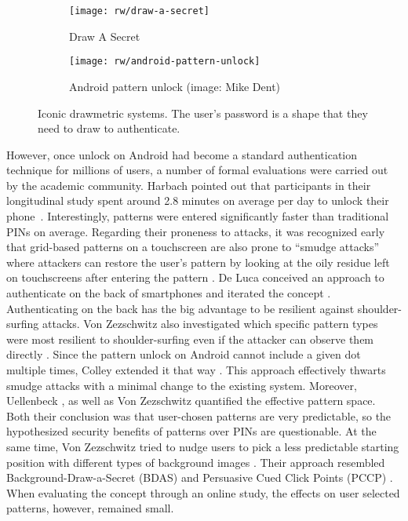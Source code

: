 	\begin{figure}[htbp]
		\centering
		\begin{subfigure}[t]{0.4\textwidth}
			\texttt{[image: rw/draw-a-secret]}
			\caption{\label{fig:rw:drawmetric:drawasecret}Draw A Secret \cite{Jermyn1999DrawASecret}}
		\end{subfigure}
		\hspace*{1em}
		\begin{subfigure}[t]{0.4\textwidth}
			\texttt{[image: rw/android-pattern-unlock]}
			\caption{\label{fig:rw:drawmetric:patternunlock} Android pattern unlock (image: Mike Dent)}
		\end{subfigure}
		\caption{\label{fig:rw:drawmetric} Iconic drawmetric systems. The user's password is a shape that they need to draw to authenticate.}
	\end{figure}
	
	However, once unlock on Android had become a standard authentication technique for millions of users, a number of formal evaluations were carried out by the academic community. Harbach \etal pointed out that participants in their longitudinal study spent around 2.8 minutes on average per day to unlock their phone \cite{Harbach2016HardLockLife}. Interestingly, patterns were entered significantly faster than traditional PINs on average. 
	Regarding their proneness to attacks, it was recognized early that grid-based patterns on a touchscreen are also prone to ``smudge attacks'' where attackers can restore the user's pattern by looking at the oily residue left on touchscreens after entering the pattern \cite{Aviv2010SmudgeAttacks}. 
	De Luca \etal conceived an approach to authenticate on the back of smartphones and iterated the concept \cite{DeLuca2013BackOfDevice,DeLuca2014NowYouSeeMe}. Authenticating on the back has the big advantage to be resilient against shoulder-surfing attacks. Von Zezschwitz \etal also investigated which specific pattern types were most resilient to shoulder-surfing even if the attacker can observe them directly \cite{VonZezschwitz2015EasyToDraw}. Since the pattern unlock on Android cannot include a given dot multiple times, Colley \etal extended it that way \cite{Colley2016ExtendingPatterns}. This approach effectively thwarts smudge attacks with a minimal change to the existing system. 
	Moreover, Uellenbeck \etal \cite{Uellenbeck2013QuantifyingSecurityPatterns}, as well as Von Zezschwitz \etal \cite{VonZezschwitz2016QuantifyingEffective} quantified the effective pattern space. Both their conclusion was that user-chosen patterns are very predictable, so the hypothesized security benefits of patterns over PINs are questionable. At the same time, Von Zezschwitz \etal tried to nudge users to pick a less predictable starting position with different types of background images \cite{VonZezschwitz2016QuantifyingEffective}. Their approach resembled Background-Draw-a-Secret (BDAS) \cite{Dunphy2007BDAS} and Persuasive Cued Click Points (PCCP) \cite{Chiasson2008PCCP}. When evaluating the concept through an online study, the effects on user selected patterns, however, remained small.

